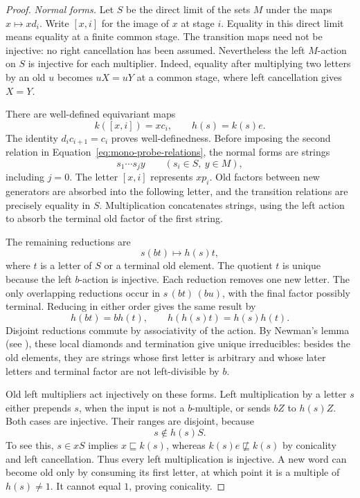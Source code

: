 \begin{proof}
\smallskip\noindent\textit{Normal forms.}
Let $S$ be the direct limit of the sets $M$ under the maps
$x\mapsto xd_i$.  Write $[x,i]$ for the image of $x$ at stage $i$.
Equality in this direct limit means equality at a finite common stage.
The transition maps need not be injective: no right cancellation has
been assumed.  Nevertheless the left $M$-action on $S$ is injective
for each multiplier.  Indeed, equality after multiplying two letters
by an old $u$ becomes $uX=uY$ at a common stage, where left
cancellation gives $X=Y$.

There are well-defined equivariant maps
\[
 k([x,i])=xc_i,\qquad h(s)=k(s)e.
\]
The identity $d_ic_{i+1}=c_i$ proves well-definedness.  Before imposing
the second relation in Equation~\eqref{eq:mono-probe-relations}, the
normal forms are strings
\[
 s_1\cdots s_j y\qquad(s_i\in S,\ y\in M),
\]
including $j=0$.  The letter $[x,i]$ represents $xp_i$.
Old factors between new generators are absorbed into the following
letter, and the transition relations are precisely equality in $S$.
Multiplication concatenates strings, using the left action to absorb
the terminal old factor of the first string.

The remaining reductions are
\begin{equation}\label{eq:mono-reduction}
 s(bt)\longmapsto h(s)t,
\end{equation}
where $t$ is a letter of $S$ or a terminal old element.  The quotient
$t$ is unique because the left $b$-action is injective.  Each reduction
removes one new letter.  The only overlapping reductions occur in
$s\,(bt)\,(bu)$, with the final factor possibly terminal.  Reducing
in either order gives the same result by
\[
 h(bt)=b h(t),\qquad h(h(s)t)=h(s)h(t).
\]
Disjoint reductions commute by associativity of the action.  By Newman's
lemma \cite{Newman1942} (see \cite[Lemma~5.13]{DershowitzPlaisted2001}), these
local diamonds and termination give unique irreducibles: besides the
old elements, they are strings whose first letter is arbitrary and
whose later letters and terminal factor are not left-divisible by $b$.

Old left multipliers act injectively on these forms.  Left multiplication
by a letter $s$ either prepends $s$, when the input is not a $b$-multiple,
or sends $bZ$ to $h(s)Z$.  Both cases are injective.  Their ranges are
disjoint, because
\begin{equation}\label{eq:mono-head-separation}
 s\notin h(s)S.
\end{equation}
To see this, $s\in xS$ implies $x\sqsubseteq k(s)$, whereas
$k(s)e\not\sqsubseteq k(s)$ by conicality and left cancellation.
Thus every left multiplication is injective.  A new word can become
old only by consuming its first letter, at which point it is a multiple
of $h(s)\ne1$.  It cannot equal $1$, proving conicality.


\end{proof}
